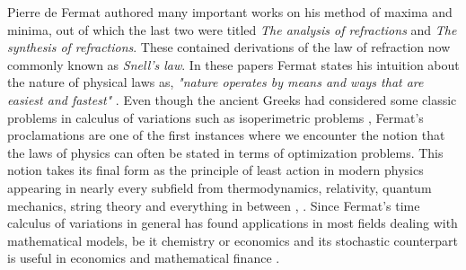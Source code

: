 Pierre de Fermat authored many important works on his method of maxima and minima, out of which the last two were titled \textit{The analysis of refractions} and \textit{The synthesis of refractions}. These contained derivations of the law of refraction now commonly known as \textit{Snell's law}. In these papers Fermat states his intuition about the nature of physical laws as, \textit{"nature operates by means and ways that are easiest and
fastest"} \cite{goldstine2012history}. Even though the ancient Greeks had considered some classic problems in calculus of variations such as  isoperimetric problems \cite{pappus1933pappus}, Fermat's proclamations are one of the first instances where we encounter the notion that the laws of physics can often be stated in terms of optimization problems. This notion takes its final form as the principle of least action in modern physics appearing in nearly every subfield from thermodynamics, relativity, quantum mechanics, string theory and everything in between \cite{coopersmith2017lazy}, \cite{rojo2018principle}. Since Fermat's time calculus of variations in general has found applications in most fields dealing with mathematical models, be it chemistry \cite{quapp2008chemical} or economics \cite{guzowska2015calculus} and its stochastic counterpart is useful in economics \cite{oksendal1997introduction} and mathematical finance \cite{malliavin2006stochastic}. 

